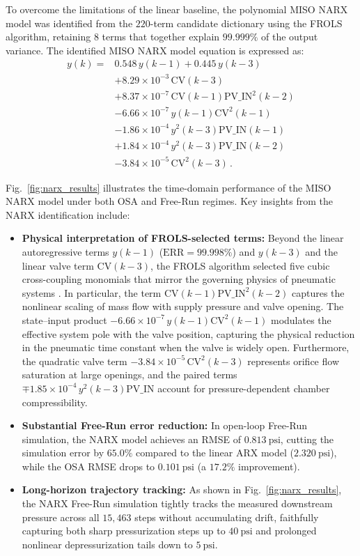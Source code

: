 \documentclass{ifacconf}
\begin{document}
To overcome the limitations of the linear baseline, the polynomial MISO NARX model was identified from the $220$-term candidate dictionary using the FROLS algorithm, retaining $8$ terms that together explain $99.999\%$ of the output variance. The identified MISO NARX model equation is expressed as:
\begin{equation}
\begin{array}{rl}
y(k) = & 0.548\,y(k-1) + 0.445\,y(k-3) \\
       & + 8.29\times 10^{-3}\,\mathrm{CV}(k-3) \\
       & + 8.37\times 10^{-7}\,\mathrm{CV}(k-1)\mathrm{PV\_IN}^2(k-2) \\
       & - 6.66\times 10^{-7}\,y(k-1)\mathrm{CV}^2(k-1) \\
       & - 1.86\times 10^{-4}\,y^2(k-3)\mathrm{PV\_IN}(k-1) \\
       & + 1.84\times 10^{-4}\,y^2(k-3)\mathrm{PV\_IN}(k-2) \\
       & - 3.84\times 10^{-5}\,\mathrm{CV}^2(k-3) \, .
\end{array}
\label{eq:narx_model}
\end{equation}

Fig.~\ref{fig:narx_results} illustrates the time-domain performance of the MISO NARX model under both OSA and Free-Run regimes. Key insights from the NARX identification include:
\begin{itemize}
    \item \textbf{Physical interpretation of FROLS-selected terms:} Beyond the linear autoregressive terms $y(k-1)$ ($\mathrm{ERR} = 99.998\%$) and $y(k-3)$ and the linear valve term $\mathrm{CV}(k-3)$, the FROLS algorithm selected five cubic cross-coupling monomials that mirror the governing physics of pneumatic systems \citep{Du2024ReviewDigitalPneumatic}. In particular, the term $\mathrm{CV}(k-1)\mathrm{PV\_IN}^2(k-2)$ captures the nonlinear scaling of mass flow with supply pressure and valve opening. The state--input product $-6.66\times 10^{-7}\,y(k-1)\mathrm{CV}^2(k-1)$ modulates the effective system pole with the valve position, capturing the physical reduction in the pneumatic time constant when the valve is widely open. Furthermore, the quadratic valve term $-3.84\times 10^{-5}\,\mathrm{CV}^2(k-3)$ represents orifice flow saturation at large openings, and the paired terms $\mp 1.85\times 10^{-4}\,y^2(k-3)\mathrm{PV\_IN}$ account for pressure-dependent chamber compressibility.
    \item \textbf{Substantial Free-Run error reduction:} In open-loop Free-Run simulation, the NARX model achieves an RMSE of $0.813~\text{psi}$, cutting the simulation error by $65.0\%$ compared to the linear ARX model ($2.320~\text{psi}$), while the OSA RMSE drops to $0.101~\text{psi}$ (a $17.2\%$ improvement).
    \item \textbf{Long-horizon trajectory tracking:} As shown in Fig.~\ref{fig:narx_results}, the NARX Free-Run simulation tightly tracks the measured downstream pressure across all $15,463$ steps without accumulating drift, faithfully capturing both sharp pressurization steps up to $40~\text{psi}$ and prolonged nonlinear depressurization tails down to $5~\text{psi}$.
\end{itemize}
\end{document}
